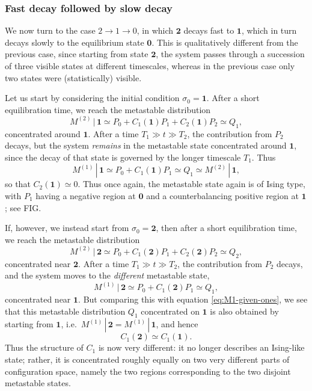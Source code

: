 \documentclass[10pt]{article}
\newcommand{\zeros}{\mathbf{0}}
\newcommand{\ones}{\mathbf{1}}
\newcommand{\twos}{\mathbf{2}}
\newcommand{\given}{\, | \,}
\newcommand{\M}[1]{M^{(#1)}}
\begin{document}
\subsubsection{Fast decay followed by slow decay}


We now turn to the case $2 \longrightarrow 1 \rightarrow 0$, in which
 $\twos$
decays fast to $\ones$, which in turn decays slowly to the equilibrium
state $\zeros$. This is qualitatively different from the previous case, since
starting from state $\twos$, the system passes through a succession of three
visible states at different timescales, whereas in the previous case only two
states were (statistically) visible.

Let us start by considering the initial condition
$\sigma_0 = \ones$. After a short equilibration time, we reach
the metastable distribution
\begin{equation}
 \M{2} \given \ones \simeq P_0 + C_1(\ones) P_1 + C_2(\ones) P_2 \simeq Q_1,
\end{equation}
concentrated around $\ones$.
After a time $T_1 \gg t \gg T_2$, the contribution from $P_2$  decays, but
the system \emph{remains} in the metastable state concentrated around $\ones$,
since the decay of that state is governed by the longer timescale $T_1$.
Thus
\begin{equation}
\label{eq:M1-given-ones}
 \M{1} \given \ones \simeq P_0 + C_1(\ones) P_1 \simeq Q_1 \simeq  \M{2} \given \ones,
\end{equation}
so that $C_2(\ones) \simeq 0$. Thus once again,  the metastable
state again is of Ising type, with $P_1$ having a
negative
region at $\zeros$ and a counterbalancing positive region at $\ones$; see FIG.

If, however, we instead start from $\sigma_0 = \twos$, then after a short
equilibration time, we reach the metastable distribution
\begin{equation}
\label{eq:m2-given-twos}
\M{2} \given \twos \simeq P_0 + C_1(\twos) P_1 + C_2(\twos) P_2 \simeq Q_2,
\end{equation}
concentrated near $\twos$.
After a time $T_1 \gg t \gg T_2$, the contribution from $P_2$
decays, and the system moves to the \emph{different} metastable state,
\begin{equation}
\label{eq:m1-given-twos}
 \M{1} \given \twos \simeq P_0 + C_1(\twos) P_1 \simeq Q_1,
\end{equation}
concentrated near $\ones$.
But comparing this with equation \eqref{eq:M1-given-ones}, we see that this metastable distribution $Q_1$
concentrated on $\ones$ is also 
obtained by starting from $\ones$, i.e.\ $\M{1}
\given
\twos = \M{1} \given \ones$, and hence 
\begin{equation}
 C_1(\twos) \simeq C_1(\ones).
\end{equation}
Thus the structure of $C_1$ is now very different: it no longer describes an
Ising-like state; rather, it is concentrated roughly equally on two very
different parts
of configuration space, namely the two regions corresponding to the two disjoint
metastable states.
\end{document}
